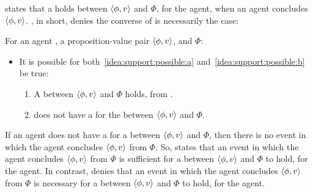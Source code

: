 \begin{note}
  \supportI{} states that a \ros{} holds between \(\langle \phi, v \rangle\) and \(\Phi\), for the agent, when an agent concludes \(\langle \phi, v \rangle\).
  \supportII{}, in short, denies the converse of \supportI{} is necessarily the case:

  \begin{idea}[\supportII{}]
    \label{idea:support:possible}
    For an agent \vAgent{}, a proposition-value pair \(\langle \phi, v \rangle\), and \pool{} \(\Phi\):

    \begin{itemize}
    \item
      It is possible for both~\ref{idea:support:possible:a} and~\ref{idea:support:possible:b} be true:
      \begin{enumerate}[label=\alph*., ref=(\alph*)]
      \item
        \label{idea:support:possible:a}
        A \ros{} between \(\langle \phi, v \rangle\) and \(\Phi\) holds, from .
      \item
        \label{idea:support:possible:b}
        \vAgent{} does not have a \wit{} for the \ros{} between \(\langle \phi, v \rangle\) and \(\Phi\).
      \end{enumerate}
    \end{itemize}
    \vspace{-\baselineskip}
  \end{idea}

  If an agent does not have a \wit{} for a \ros{} between \(\langle \phi, v \rangle\) and \(\Phi\), then there is no event in which the agent concludes \(\langle \phi, v \rangle\) from \(\Phi\).
  So, \supportI{} states that an event in which the agent concludes \(\langle \phi, v \rangle\) from \(\Phi\) is sufficient for a \ros{} between \(\langle \phi, v \rangle\) and \(\Phi\) to hold, for the agent.
  In contrast, \supportII{} denies that an event in which the agent concludes \(\langle \phi, v \rangle\) from \(\Phi\) is necessary for a \ros{} between \(\langle \phi, v \rangle\) and \(\Phi\) to hold, for the agent.
\end{note}

